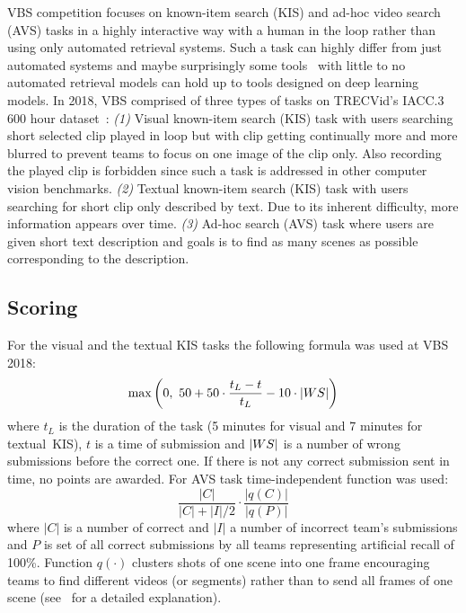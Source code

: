 VBS competition focuses on known-item search (KIS) and ad-hoc video search (AVS) tasks in a highly interactive
way with a human in the loop rather than using only automated retrieval systems. Such a task can highly differ from just automated systems and maybe surprisingly some tools~\cite{Storyboard-Based_Interface,duane2018virtual} with little to no automated retrieval models can hold up to tools designed on deep learning models. In 2018, VBS comprised of three types of tasks on TRECVid's IACC.3 600 hour dataset~\cite{awad2016trecvid}: \textit{(1)} Visual known-item search (KIS) task with users searching short selected clip played in loop but with clip getting continually more and more blurred to prevent teams to focus on one image of the clip only. Also recording the played clip is forbidden since such a task is addressed in other computer vision benchmarks. \textit{(2)} Textual known-item search (KIS) task with users searching for short clip only described by text. Due to its inherent difficulty, more information appears over time. \textit{(3)} Ad-hoc search (AVS) task where users are given short text description and goals is to find as many scenes as possible corresponding to the description.

\subsection{Scoring}
For the visual and the textual KIS tasks the following formula was used at VBS 2018:
\begin{equation}
\max\left(0,\ 50 + 50\cdot\frac{t_L-t}{t_L} - 10\cdot\left|{WS}\right|\right)
\end{equation}
where $t_L$ is the duration of the task (5 minutes for visual and 7 minutes for textual~KIS), $t$ is a time of submission and $\left|{WS}\right|$ is a number of wrong submissions before the correct one. If there is not any correct submission sent in time, no points are awarded. For AVS task time-independent function was used:
\begin{equation}
\frac{|C|}{|C|+|I|/2}\cdot\frac{|q(C)|}{|q(P)|}
\end{equation}
where $|C|$ is a number of correct and $|I|$ a number of incorrect team's submissions and $P$ is set of all correct submissions by all teams representing artificial recall of 100\%. Function $q(\cdot)$ clusters shots of one scene into one frame encouraging teams to find different videos (or segments) rather than to send all frames of one scene (see~\cite{Lokoc-influential-trends} for a detailed explanation).

